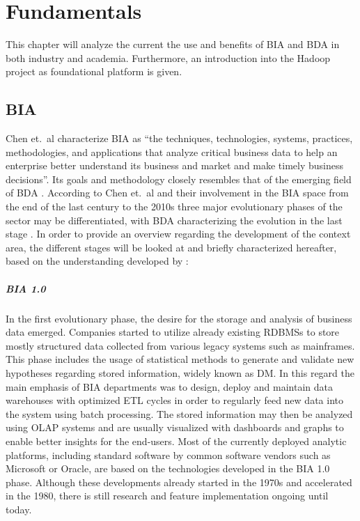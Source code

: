 \chapter{Fundamentals}
\label{chap:fund}
This chapter will analyze the current the use and benefits of \ac{BIA} and \ac{BDA} in both industry and academia. Furthermore, an introduction into the Hadoop project as foundational platform is given. 

\section{\acl{BIA}}
\label{sota-bia}
Chen et.~al characterize \ac{BIA} as \enquote{the techniques, technologies, systems, practices, methodologies, and applications that analyze critical business data to help an enterprise better understand its business and market and make timely business decisions}\autocite[][p.~1166]{chen2012business}. Its goals and methodology closely resembles that of the emerging field of \ac{BDA} \autocite[][p.~1166]{chen2012business}.
According to Chen et.~al and their involvement in the \ac{BIA} space from the end of the last century to the 2010s three major evolutionary phases of the sector may be differentiated, with \ac{BDA} characterizing the evolution in the last stage \autocite[][p.~1168 \psqq]{chen2012business}. In order to provide an overview regarding the development of the context area, the different stages will be looked at and briefly characterized hereafter, based on the understanding developed by \textcite[p.~1166 \psqq]{chen2012business}:

\paragraph{\ac{BIA} 1.0} In the first evolutionary phase, the desire for the storage and analysis of business data emerged. Companies started to utilize already existing \acp{RDBMS} to store mostly structured data collected from various legacy systems such as mainframes. This phase includes the usage of statistical methods to generate and validate new hypotheses regarding stored information, widely known as \ac{DM}. In this regard the main emphasis of \ac{BIA} departments was to design, deploy and maintain data warehouses with optimized \ac{ETL} cycles in order to regularly feed new data into the system using batch processing. The stored information may then be analyzed using \ac{OLAP} systems and are usually visualized with dashboards and graphs to enable better insights for the end-users.
Most of the currently deployed analytic platforms, including standard software by common software vendors such as Microsoft or Oracle, are based on the technologies developed in the \ac{BIA} 1.0 phase. Although these developments already started in the 1970s and accelerated in the 1980, there is still research and feature implementation ongoing until today.


